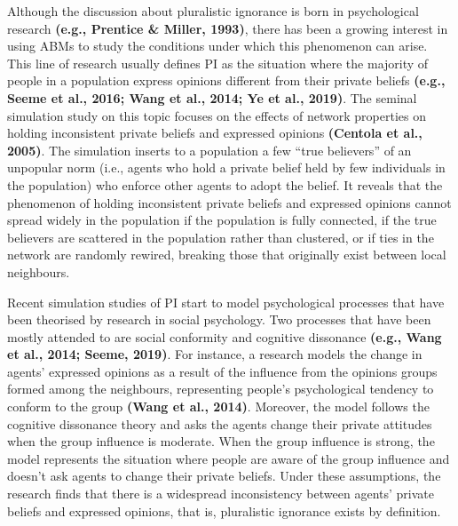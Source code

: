 \documentclass[
  11pt,
]{article}
\begin{document}
Although the discussion about pluralistic ignorance is born in
psychological research \textbf{(e.g., Prentice \& Miller, 1993)}, there
has been a growing interest in using ABMs to study the conditions under
which this phenomenon can arise. This line of research usually defines
PI as the situation where the majority of people in a population express
opinions different from their private beliefs \textbf{(e.g., Seeme et
al., 2016; Wang et al., 2014; Ye et al., 2019)}. The seminal simulation
study on this topic focuses on the effects of network properties on
holding inconsistent private beliefs and expressed opinions
\textbf{(Centola et al., 2005)}. The simulation inserts to a population
a few ``true believers'' of an unpopular norm (i.e., agents who hold a
private belief held by few individuals in the population) who enforce
other agents to adopt the belief. It reveals that the phenomenon of
holding inconsistent private beliefs and expressed opinions cannot
spread widely in the population if the population is fully connected, if
the true believers are scattered in the population rather than
clustered, or if ties in the network are randomly rewired, breaking
those that originally exist between local neighbours.

Recent simulation studies of PI start to model psychological processes
that have been theorised by research in social psychology. Two processes
that have been mostly attended to are social conformity and cognitive
dissonance \textbf{(e.g., Wang et al., 2014; Seeme, 2019)}. For
instance, a research models the change in agents' expressed opinions as
a result of the influence from the opinions groups formed among the
neighbours, representing people's psychological tendency to conform to
the group \textbf{(Wang et al., 2014)}. Moreover, the model follows the
cognitive dissonance theory and asks the agents change their private
attitudes when the group influence is moderate. When the group influence
is strong, the model represents the situation where people are aware of
the group influence and doesn't ask agents to change their private
beliefs. Under these assumptions, the research finds that there is a
widespread inconsistency between agents' private beliefs and expressed
opinions, that is, pluralistic ignorance exists by definition.
\end{document}
